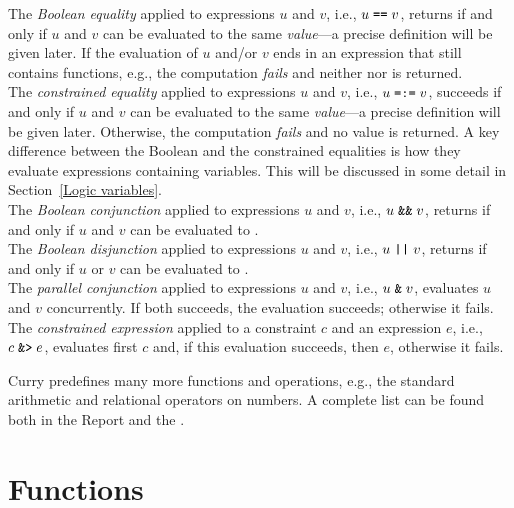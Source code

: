 \vspace{3ex}
\noindent
The \emph{Boolean equality}
applied to expressions $u$ and $v$, i.e.,
$u\;\mbox{\tt ==}\;v$, returns 
if and only if $u$ and $v$ can be evaluated to the
same \emph{value}---a precise definition will be given later. 
If the evaluation of $u$ and/or $v$ ends in an expression that
still contains functions, e.g.,  the computation
\emph{fails} and neither  nor  is returned.
\\[1ex]
The \emph{constrained equality}%
applied to expressions $u$ and $v$, i.e.,
$u\;\mbox{\tt =:=}\;v$, succeeds
if and only if $u$ and $v$ can be evaluated to the
same \emph{value}---a precise definition will be given later. 
Otherwise, the computation \emph{fails} and no value is returned.
A key difference between the Boolean and the constrained equalities
is how they evaluate expressions containing variables.
This will be discussed in some detail in Section~\ref{Logic variables}.
\\[1ex]
The \emph{Boolean conjunction}%
applied to expressions $u$ and $v$, i.e.,
$u\;\mbox{\tt \&\&}\;v$, returns 
if and only if $u$ and $v$ can be evaluated to .
\\[1ex]
The \emph{Boolean disjunction}%
applied to expressions $u$ and $v$, i.e.,
$u\;\mbox{\tt ||}\;v$, returns 
if and only if $u$ or $v$ can be evaluated to .
\\[1ex]
The \emph{parallel conjunction}%
applied to expressions $u$ and $v$, i.e.,
$u\;\mbox{\tt \&}\;v$, evaluates $u$ and $v$ concurrently.
If both succeeds, the evaluation succeeds;
otherwise it fails.
\\[1ex]
The \emph{constrained expression}%
applied to a constraint $c$ and an expression $e$, i.e.,
$c\;\mbox{\tt \&>}\;e$, evaluates first $c$ and, if this evaluation
succeeds, then $e$, otherwise it fails.

Curry predefines many more functions and operations, e.g.,
the standard arithmetic and relational operators on numbers.
A complete list can be found both in the Report and the .

\section{Functions}

